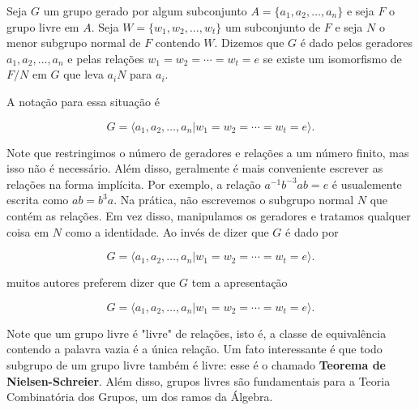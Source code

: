 	\begin{deff}
		Seja $G$ um grupo gerado por algum subconjunto $A = \{ a_1, a_2, \dots, a_n \}$ e seja $F$ o grupo livre em $A$. Seja $W = \{ w_1, w_2, \dots, w_t \}$ um subconjunto de $F$ e seja $N$ o menor subgrupo normal de $F$ contendo $W$. Dizemos que $G$ é dado pelos geradores $a_1, a_2, \dots, a_n$ e pelas relações $w_1 = w_2 = \cdots = w_t = e$ se existe um isomorfismo de $F/N$ em $G$ que leva $a_iN$ para $a_i$.
	\end{deff}
	
	\par\vspace{0.3cm} A notação para essa situação é
	
	\begin{equation*}
	G = \langle a_1, a_2, \dots, a_n | w_1 = w_2 = \cdots = w_t = e \rangle.
	\end{equation*}
	
	\par\vspace{0.3cm} Note que restringimos o número de geradores e relações a um número finito, mas isso não é necessário. Além disso, geralmente é mais conveniente escrever as relações na forma implícita. Por exemplo, a relação $a^{-1}b^{-3}ab = e$ é usualemente escrita como $ab = b^3a$. Na prática, não escrevemos o subgrupo normal $N$ que contém as relações. Em vez disso, manipulamos os geradores e tratamos qualquer coisa em $N$ como a identidade. Ao invés de dizer que $G$ é dado por  
	
	\begin{equation*}
	G = \langle a_1, a_2, \dots, a_n | w_1 = w_2 = \cdots = w_t = e \rangle.
	\end{equation*}
	
	\par\vspace{0.3cm} muitos autores preferem dizer que $G$ tem a apresentação 
	
	\begin{equation*}
	G = \langle a_1, a_2, \dots, a_n | w_1 = w_2 = \cdots = w_t = e \rangle.
	\end{equation*}
	
	\par\vspace{0.3cm} Note que um grupo livre é "livre" de relações, isto é, a classe de equivalência contendo a palavra vazia é a única relação. Um fato interessante é que todo subgrupo de um grupo livre também é livre: esse é o chamado \textbf{Teorema de Nielsen-Schreier}. Além disso, grupos livres são fundamentais para a Teoria Combinatória dos Grupos, um dos ramos da Álgebra.
	
